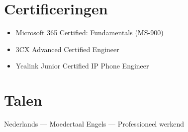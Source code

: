 \documentclass[a4paper,10pt]{article}
\begin{document}
\section{Certificeringen}

\begin{itemize}[leftmargin=12pt]
  \item Microsoft 365 Certified: Fundamentals (MS-900)
  \item 3CX Advanced Certified Engineer
  \item Yealink Junior Certified IP Phone Engineer
\end{itemize}

\section{Talen}

Nederlands --- Moedertaal \quad Engels --- Professioneel werkend
\end{document}
